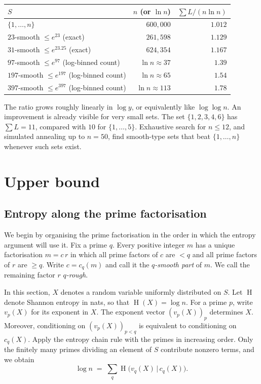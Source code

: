 \documentclass[11pt]{article}
\theoremstyle{remark}
\DeclareMathOperator{\HH}{H}
\begin{document}
\begin{center}
\begin{tabular}{lrr}
\toprule
$S$ & $n$ (or $\ln n$) & $\sum L/(n\ln n)$ \\
\midrule
$\{1,\dots,n\}$ & $600{,}000$ & $1.012$ \\
$23$-smooth $\le e^{23}$ (exact) & $261{,}598$ & $1.129$ \\
$31$-smooth $\le e^{23.25}$ (exact) & $624{,}354$ & $1.167$ \\
$97$-smooth $\le e^{97}$ (log-binned count) & $\ln n\approx 37$ & $1.39$ \\
$197$-smooth $\le e^{197}$ (log-binned count) & $\ln n\approx 65$ & $1.54$ \\
$397$-smooth $\le e^{397}$ (log-binned count) & $\ln n\approx 113$ & $1.78$ \\
\bottomrule
\end{tabular}
\end{center}
The ratio grows roughly linearly in $\log y$, or equivalently like $\log\log n$.
An improvement is already visible for very small sets.
The set $\{1,2,3,4,6\}$ has $\sum L=11$, compared with $10$ for $\{1,\dots,5\}$.
Exhaustive search for $n\le 12$, and simulated annealing up to $n=50$, find smooth-type sets that beat $\{1,\dots,n\}$ whenever such sets exist.

\section{Upper bound}

\subsection{Entropy along the prime factorisation}

We begin by organising the prime factorisation in the order in which the entropy argument will use it.
Fix a prime $q$.
Every positive integer $m$ has a unique factorisation $m=c\,r$ in which all prime factors of $c$ are $<q$ and all prime factors of $r$ are $\ge q$.
Write $c=c_q(m)$ and call it the \emph{$q$-smooth part} of $m$.
We call the remaining factor $r$ \emph{$q$-rough}.

In this section, $X$ denotes a random variable uniformly distributed on $S$.
Let $\HH$ denote Shannon entropy in nats, so that $\HH(X)=\log n$.
For a prime $p$, write $v_p(X)$ for its exponent in $X$.
The exponent vector $(v_p(X))_p$ determines $X$.
Moreover, conditioning on $(v_p(X))_{p<q}$ is equivalent to conditioning on $c_q(X)$.
Apply the entropy chain rule with the primes in increasing order.
Only the finitely many primes dividing an element of $S$ contribute nonzero terms, and we obtain
\begin{equation}\label{eq:chain}
  \log n \;=\; \sum_{q}\HH\bigl(v_q(X)\,\big|\,c_q(X)\bigr).
\end{equation}
\end{document}
